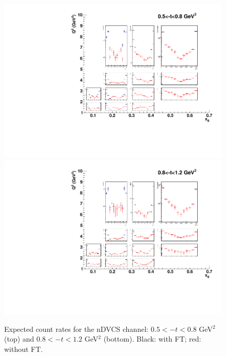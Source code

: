 \begin{figure}  
\begin{center}
\includegraphics[width=120mm]{plot_counts_3_FT_noFT_100days.pdf}
\includegraphics[width=120mm]{plot_counts_4_FT_noFT_100days.pdf}
\caption{Expected count rates for the nDVCS channel: $0.5<-t<0.8$ GeV$^2$ (top) and $0.8<-t<1.2$ GeV$^2$ (bottom). Black: with FT; red: without FT.\label{count_rate_2}}
\end{center}
\end{figure}

